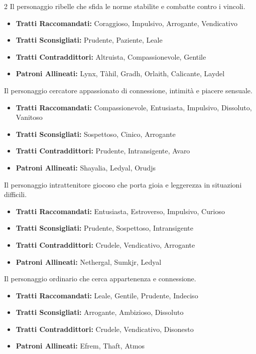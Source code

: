 \begin{multicols}{2}
Il personaggio ribelle che sfida le norme stabilite e combatte contro i vincoli.

\noindent\begin{itemize}[leftmargin=*] \setlength{\itemsep}{0pt}
\item \textbf{Tratti Raccomandati:} Coraggioso, Impulsivo, Arrogante, Vendicativo
\item \textbf{Tratti Sconsigliati:} Prudente, Paziente, Leale
\item \textbf{Tratti Contraddittori:} Altruista, Compassionevole, Gentile
\item \textbf{Patroni Allineati:} Lynx, Tàhil, Gradh, Orlaith, Calicante, Laydel
\end{itemize}

Il personaggio cercatore appassionato di connessione, intimità e piacere sensuale.

\noindent\begin{itemize}[leftmargin=*] \setlength{\itemsep}{0pt}
\item \textbf{Tratti Raccomandati:} Compassionevole, Entusiasta, Impulsivo, Dissoluto, Vanitoso
\item \textbf{Tratti Sconsigliati:} Sospettoso, Cinico, Arrogante
\item \textbf{Tratti Contraddittori:} Prudente, Intransigente, Avaro
\item \textbf{Patroni Allineati:} Shayalia, Ledyal, Orudjs
\end{itemize}

Il personaggio intrattenitore giocoso che porta gioia e leggerezza in situazioni difficili.

\noindent\begin{itemize}[leftmargin=*] \setlength{\itemsep}{0pt}
\item \textbf{Tratti Raccomandati:} Entusiasta, Estroverso, Impulsivo, Curioso
\item \textbf{Tratti Sconsigliati:} Prudente, Sospettoso, Intransigente
\item \textbf{Tratti Contraddittori:} Crudele, Vendicativo, Arrogante
\item \textbf{Patroni Allineati:} Nethergal, Sumkjr, Ledyal
\end{itemize}

Il personaggio ordinario che cerca appartenenza e connessione.

\noindent\begin{itemize}[leftmargin=*] \setlength{\itemsep}{0pt}
\item \textbf{Tratti Raccomandati:} Leale, Gentile, Prudente, Indeciso
\item \textbf{Tratti Sconsigliati:} Arrogante, Ambizioso, Dissoluto
\item \textbf{Tratti Contraddittori:} Crudele, Vendicativo, Disonesto
\item \textbf{Patroni Allineati:} Efrem, Thaft, Atmos
\end{itemize}


\end{multicols}
